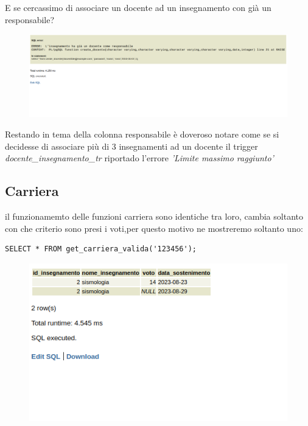 E se cercassimo di associare un docente ad un insegnamento con già un responsabile? 
\begin{figure}[ht]
    \centering
    \includegraphics[width=0.9\linewidth]{images/createDocenteResponsabileError.png}
    \label{succ:creaDocenmteErrorResp}
\end{figure}

Restando in tema della colonna responsabile è doveroso notare come se si decidesse di associare più di 3 insegnamenti ad un docente  il trigger \textit{docente\_insegnamento\_tr} riportado l'errore  \textit{'Limite massimo raggiunto'}
\subsection{Carriera}
il funzionamemto delle funzioni carriera sono identiche tra loro, cambia soltanto con che criterio sono presi i voti,per questo motivo ne mostreremo soltanto uno:
\begin{lstlisting}[style=sqlStyle]
 SELECT * FROM get_carriera_valida('123456');
\end{lstlisting}
\begin{figure}[ht]
    \centering
    \includegraphics[width=0.9\linewidth]{images/getCarriera.png}
    \label{succ:creaDocenmteErrorResp}
\end{figure}

